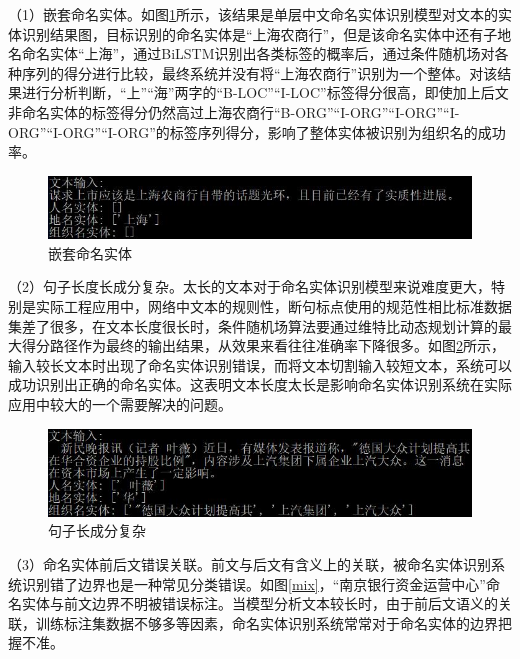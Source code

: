 \documentclass[winfonts,master,oneside,nobackinfo]{njuthesis}
\begin{document}
（1）嵌套命名实体。如图\ref{cascade}所示，该结果是单层中文命名实体识别模型对文本的实体识别结果图，目标识别的命名实体是“上海农商行”，但是该命名实体中还有子地名命名实体“上海”，通过BiLSTM识别出各类标签的概率后，通过条件随机场对各种序列的得分进行比较，最终系统并没有将“上海农商行”识别为一个整体。对该结果进行分析判断，“上”“海”两字的“B-LOC”“I-LOC”标签得分很高，即使加上后文非命名实体的标签得分仍然高过上海农商行“B-ORG”“I-ORG”“I-ORG”“I-ORG”“I-ORG”“I-ORG”的标签序列得分，影响了整体实体被识别为组织名的成功率。

\begin{figure}[H]
\centering
\begin{minipage}[t]{\textwidth}
\includegraphics[width=1\textwidth]{./figure/嵌套命名实体.jpg}
\caption{嵌套命名实体}
\label{cascade}
\end{minipage}
\end{figure}

（2）句子长度长成分复杂。太长的文本对于命名实体识别模型来说难度更大，特别是实际工程应用中，网络中文本的规则性，断句标点使用的规范性相比标准数据集差了很多，在文本长度很长时，条件随机场算法要通过维特比动态规划计算的最大得分路径作为最终的输出结果，从效果来看往往准确率下降很多。如图\ref{long}所示，输入较长文本时出现了命名实体识别错误，而将文本切割输入较短文本，系统可以成功识别出正确的命名实体。这表明文本长度太长是影响命名实体识别系统在实际应用中较大的一个需要解决的问题。


\begin{figure}[H]
\centering
\begin{minipage}[t]{\textwidth}
\includegraphics[width=1\textwidth]{./figure/句子长成分复杂.jpg}
\caption{句子长成分复杂}
\label{long}
\end{minipage}
\end{figure}

（3）命名实体前后文错误关联。前文与后文有含义上的关联，被命名实体识别系统识别错了边界也是一种常见分类错误。如图\ref{mix}，“南京银行资金运营中心”命名实体与前文边界不明被错误标注。当模型分析文本较长时，由于前后文语义的关联，训练标注集数据不够多等因素，命名实体识别系统常常对于命名实体的边界把握不准。
\end{document}
